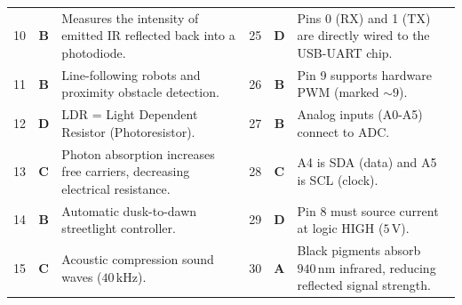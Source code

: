 \begin{table}[htbp]
\begin{tabularx}{\textwidth}{l c X l c X}
10 & \textbf{B} & Measures the intensity of emitted IR reflected back into a photodiode. & 25 & \textbf{D} & Pins 0 (RX) and 1 (TX) are directly wired to the USB-UART chip. \\
11 & \textbf{B} & Line-following robots and proximity obstacle detection. & 26 & \textbf{B} & Pin 9 supports hardware PWM (marked $\sim 9$). \\
12 & \textbf{D} & LDR = Light Dependent Resistor (Photoresistor). & 27 & \textbf{B} & Analog inputs (A0-A5) connect to ADC. \\
13 & \textbf{C} & Photon absorption increases free carriers, decreasing electrical resistance. & 28 & \textbf{C} & A4 is SDA (data) and A5 is SCL (clock). \\
14 & \textbf{B} & Automatic dusk-to-dawn streetlight controller. & 29 & \textbf{D} & Pin 8 must source current at logic HIGH ($5\,\text{V}$). \\
15 & \textbf{C} & Acoustic compression sound waves ($40\,\text{kHz}$). & 30 & \textbf{A} & Black pigments absorb $940\,\text{nm}$ infrared, reducing reflected signal strength. \\
\bottomrule
\end{tabularx}
\end{table}

